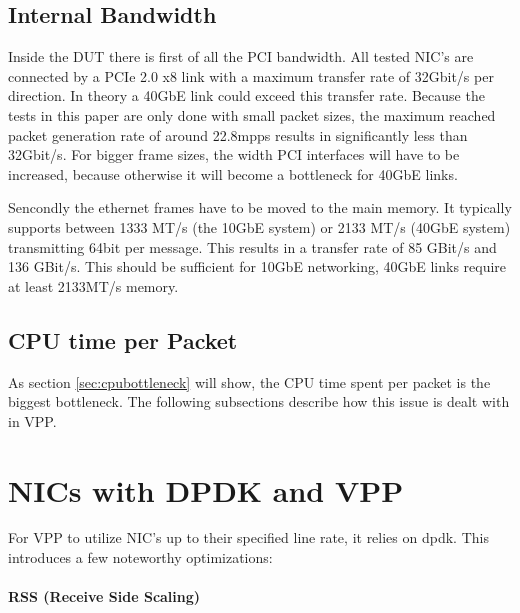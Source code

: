 
\subsection{Internal Bandwidth}


Inside the DUT there is first of all the PCI bandwidth. All tested
NIC's are connected by a PCIe 2.0 x8 link with a maximum transfer rate
of 32Gbit/s per direction. In theory a 40GbE link could exceed this
transfer rate. Because the tests in this paper are only done with
small packet sizes, the maximum reached packet generation rate of
around 22.8mpps results in significantly less than 32Gbit/s. For
bigger frame sizes, the width PCI interfaces will have to be
increased, because otherwise it will become a bottleneck for
40GbE links.


Sencondly the ethernet frames have to be moved to the main memory. It
typically supports between 1333 MT/s (the 10GbE system) or 2133 MT/s
(40GbE system) transmitting 64bit per message. This results in a
transfer rate of 85 GBit/s and 136 GBit/s. This should be sufficient
for 10GbE networking, 40GbE links require at least 2133MT/s memory.

\subsection{CPU time per Packet}

As section \ref{sec:cpubottleneck} will show, the CPU time spent per
packet is the biggest bottleneck. The following subsections describe
how this issue is dealt with in VPP.




\section{NICs with DPDK and VPP}

For VPP to utilize NIC's up to their specified line rate, it relies on
\Ac{dpdk}. This introduces a few noteworthy optimizations:

\paragraph{RSS (Receive Side Scaling)}
\label{sec:rss}

